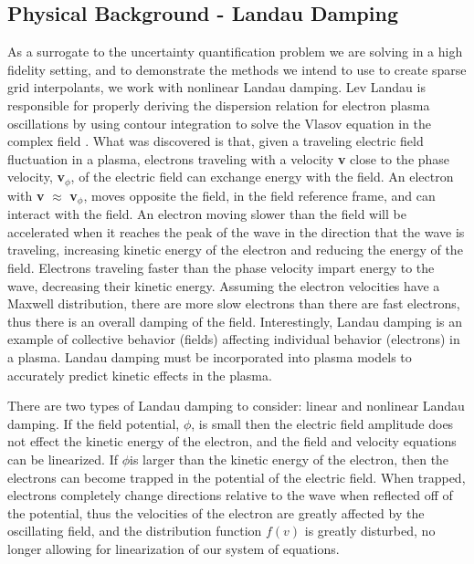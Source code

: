 \documentclass{article}
\begin{document}
\subsection{Physical Background - Landau Damping}
As a surrogate to the uncertainty quantification problem we are solving in a high fidelity setting, and to demonstrate the methods we intend to use to create sparse grid interpolants, we work with nonlinear Landau damping. Lev Landau is responsible for properly deriving the dispersion relation for electron plasma oscillations by using contour integration to solve the Vlasov equation in the complex field \cite{Chen}. What was discovered is that, given a traveling electric field fluctuation in a plasma, electrons traveling with a velocity \textbf{v} close to the phase velocity, \textbf{v}$_{\phi}$, of the electric field can exchange energy with the field. An electron with \textbf{v}  $\approx$ \textbf{ v}$_{\phi}$, moves opposite the field, in the field reference frame, and can interact with the field. An electron moving slower than the field will be accelerated when it reaches the peak of the wave in the direction that the wave is traveling, increasing kinetic energy of the electron and reducing the energy of the field. Electrons traveling faster than the phase velocity impart energy to the wave, decreasing their kinetic energy. Assuming the electron velocities have a Maxwell distribution, there are more slow electrons than there are fast electrons, thus there is an overall damping of the field. Interestingly, Landau damping is an example of collective behavior (fields) affecting individual behavior (electrons) in a plasma. Landau damping must be incorporated into plasma models to accurately predict kinetic effects in the plasma. \cite{Manfredi} \\

\vspace{0.01cm}

There are two types of Landau damping to consider: linear and nonlinear Landau damping. If the field potential, $\phi$, is small then the electric field amplitude does not effect the kinetic energy of the electron, and the field and velocity equations can be linearized. If $\phi$is larger than the kinetic energy of the electron, then the electrons can become trapped in the potential of the electric field. When trapped, electrons completely change directions relative to the wave when reflected off of the potential, thus the velocities of the electron are greatly affected by the oscillating field, and the distribution function $f(v)$ is greatly disturbed, no longer allowing for linearization of our system of equations. \\
\end{document}
